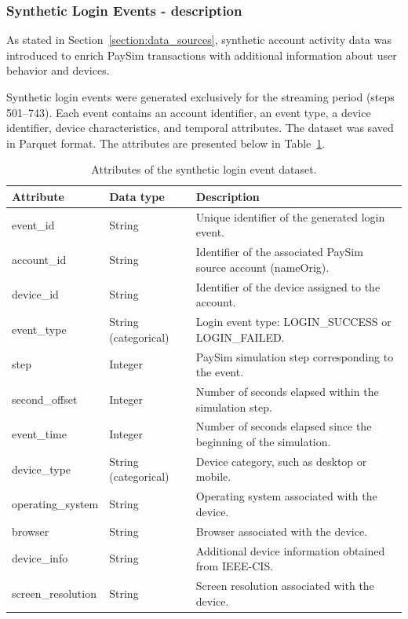 \documentclass[titlepage]{article}
\begin{document}
\subsubsection{Synthetic Login Events - description}
As stated in Section~\ref{section:data_sources}, synthetic account activity data was introduced to enrich PaySim transactions with additional information about user behavior and devices.

Synthetic login events were generated exclusively for the streaming period (steps 501–743). Each event contains an account identifier, an event type, a device identifier, device characteristics, and temporal attributes. The dataset was saved in Parquet format. The attributes are presented below in Table~\ref{tab:login_data_description}.

\begin{table}[H]
    \centering
    \caption{Attributes of the synthetic login event dataset.}
    \label{tab:login_data_description}
    \small
    \begin{tabular}{lll}
        \toprule
        \textbf{Attribute} & \textbf{Data type} & \textbf{Description}\\
        \midrule
        event\_id & String & Unique identifier of the generated login event.\\
        account\_id & String & Identifier of the associated PaySim source account (nameOrig).\\
        device\_id & String & Identifier of the device assigned to the account.\\
        event\_type & String (categorical) & Login event type: LOGIN\_SUCCESS or LOGIN\_FAILED.\\
        step & Integer & PaySim simulation step corresponding to the event.\\
        second\_offset & Integer & Number of seconds elapsed within the simulation step.\\
        event\_time & Integer & Number of seconds elapsed since the beginning of the simulation.\\
        device\_type & String (categorical) & Device category, such as desktop or mobile.\\
        operating\_system & String & Operating system associated with the device.\\
        browser & String & Browser associated with the device.\\
        device\_info & String & Additional device information obtained from IEEE-CIS.\\
        screen\_resolution & String & Screen resolution associated with the device.\\
        \bottomrule
    \end{tabular}
\end{table}
\end{document}
